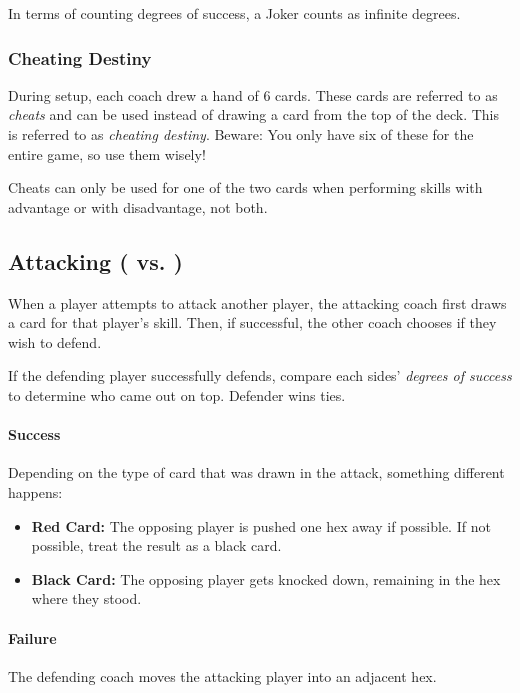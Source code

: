 \begin{note}
    In terms of counting degrees of success, a Joker counts as infinite degrees.
\end{note}

\subsubsection{Cheating Destiny}
During setup, each coach drew a hand of 6 cards.
These cards are referred to as \textit{cheats} and can be used instead of drawing a card from the top of the deck. This is referred to as \textit{cheating destiny}.
Beware: You only have six of these for the entire game, so use them wisely!

\begin{note}
    Cheats can only be used for one of the two cards when performing skills with advantage or with disadvantage, not both.
\end{note}

\subsection{Attacking (\strength{} vs. \strength{})}
When a player attempts to attack another player, the attacking coach first draws a card for that player's \strength{} skill.
Then, if successful, the other coach chooses if they wish to defend.

If the defending player successfully defends, compare each sides' \textit{degrees of success} to determine who came out on top. Defender wins ties.

\paragraph{Success}
Depending on the type of card that was drawn in the attack, something different happens:
\begin{itemize}
    \item \textbf{Red Card:} The opposing player is pushed one hex away if possible. If not possible, treat the result as a black card.
    \item \textbf{Black Card:} The opposing player gets knocked down, remaining in the hex where they stood.
\end{itemize}
\paragraph{Failure}
The defending coach moves the attacking player into an adjacent hex.
